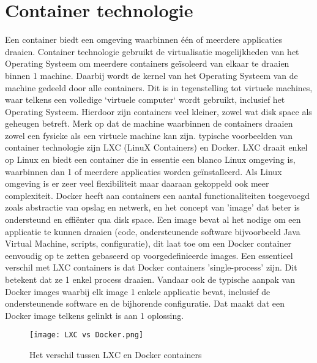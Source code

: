 \section{Container technologie}
Een container biedt een omgeving waarbinnen één of meerdere applicaties draaien. Container technologie gebruikt de virtualisatie mogelijkheden van het Operating Systeem om meerdere containers geïsoleerd van elkaar te draaien binnen 1 machine. Daarbij wordt de kernel van het Operating Systeem van de machine gedeeld door alle containers.
\newline
Dit is in tegenstelling tot virtuele machines, waar telkens een volledige `virtuele computer` wordt gebruikt, inclusief het Operating Systeem. Hierdoor zijn containers veel kleiner, zowel wat disk space als geheugen betreft.
\newline
Merk op dat de machine waarbinnen de containers draaien zowel een fysieke als een virtuele machine kan zijn.
 typische voorbeelden van container technologie zijn LXC (LinuX Containers) en Docker.
\newline
LXC draait enkel op Linux en biedt een container die in essentie een blanco Linux omgeving is, waarbinnen dan 1 of meerdere applicaties worden geïnstalleerd. Als Linux omgeving is er zeer veel flexibiliteit maar daaraan gekoppeld ook meer complexiteit.
\newline
Docker heeft aan containers een aantal functionaliteiten toegevoegd zoals abstractie van opslag en netwerk, en het concept van 'image' dat beter is ondersteund en effiënter qua disk space. Een image bevat al het nodige om een applicatie te kunnen draaien (code, ondersteunende software bijvoorbeeld Java Virtual Machine, scripts, configuratie), dit laat toe om een Docker container eenvoudig op te zetten gebaseerd op voorgedefinieerde images.
\newline
Een essentieel verschil met LXC containers is dat Docker containers 'single-process' zijn. Dit betekent dat ze 1 enkel process draaien. Vandaar ook de typische aanpak van Docker images waarbij elk image 1 enkele applicatie bevat, inclusief de ondersteunende software en de bijhorende configuratie. Dat maakt dat een Docker image telkens gelinkt is aan 1 oplossing.
\newline
\begin{figure}[H]
    \texttt{[image: LXC vs Docker.png]}
    \caption{Het verschil tussen LXC en Docker containers\autocite{Kahuha2023}}
\end{figure}

